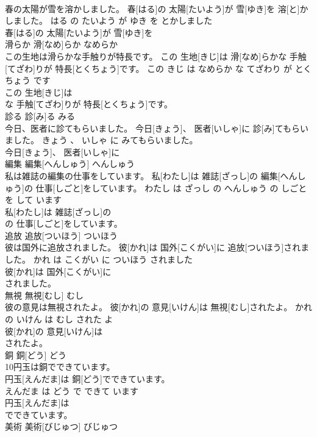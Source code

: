 \documentclass[8pt]{extreport}
\begin{document}
\begin{CJK}{UTF8}{min}
\\	春の太陽が雪を溶かしました。	春[はる]の 太陽[たいよう]が 雪[ゆき]を 溶[と]かしました。	はる の たいよう が ゆき を とかしました	
\\	春[はる]の 太陽[たいよう]が 雪[ゆき]を
\\	滑らか	滑[なめ]らか	なめらか	
\\	この生地は滑らかな手触りが特長です。	この 生地[きじ]は 滑[なめ]らかな 手触[てざわ]りが 特長[とくちょう]です。	この きじ は なめらか な てざわり が とくちょう です	
\\	この 生地[きじ]は
\\	な 手触[てざわ]りが 特長[とくちょう]です。			
\\	診る	診[み]る	みる	
\\	今日、医者に診てもらいました。	今日[きょう]、 医者[いしゃ]に 診[み]てもらいました。	きょう 、 いしゃ に みてもらいました。	
\\	今日[きょう]、 医者[いしゃ]に
\\	編集	編集[へんしゅう]	へんしゅう	
\\	私は雑誌の編集の仕事をしています。	私[わたし]は 雑誌[ざっし]の 編集[へんしゅう]の 仕事[しごと]をしています。	わたし は ざっし の へんしゅう の しごと を して います	
\\	私[わたし]は 雑誌[ざっし]の
\\	の 仕事[しごと]をしています。			
\\	追放	追放[ついほう]	ついほう	
\\	彼は国外に追放されました。	彼[かれ]は 国外[こくがい]に 追放[ついほう]されました。	かれ は こくがい に ついほう されました	
\\	彼[かれ]は 国外[こくがい]に
\\	されました。			
\\	無視	無視[むし]	むし	
\\	彼の意見は無視されたよ。	彼[かれ]の 意見[いけん]は 無視[むし]されたよ。	かれ の いけん は むし された よ	
\\	彼[かれ]の 意見[いけん]は
\\	されたよ。			
\\	銅	銅[どう]	どう	
\\	10円玉は銅でできています。	
\\	円玉[えんだま]は 銅[どう]でできています。	
\\	えんだま は どう で できて います	
\\	円玉[えんだま]は
\\	でできています。			
\\	美術	美術[びじゅつ]	びじゅつ	

\end{CJK}
\end{document}
